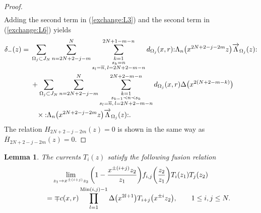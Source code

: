 \documentclass[pdftex]{sigma}
\numberwithin{equation}{section}
\newtheorem{Lemma}[Theorem]{Lemma}
\begin{document}
\begin{proof}
\begin{align}
\label{def:delta+}
\end{align}
Adding the second term in (\ref{exchange:L3}) and the second term in (\ref{exchange:L6}) yields
\begin{align}
{\delta}_-(z)={}&\sum_{\Omega_j \subset J_N}\sum_{n=2N+2-j-m}^{N}
\sum\limits_{\substack{k=1\\s_k=n
\\s_l=\overline{n},\, l=2N+2-m-n}}^{2N+1-m-n}d_{\Omega_j}(x,r)
{:}\Lambda_{n}\big(x^{2N+2-j-2m}z\big)\overrightarrow{\Lambda}_{\Omega_j}(z){:}\notag
\\
&+\sum_{\Omega_j \subset J_N}\sum_{n=2N+2-j-m}^{N}
\sum\limits_{\substack{k=1\\s_{k-1}\prec n \prec s_k
\\s_l=\overline{n}, \, l=2N+2-m-n}}^{2N+2-m-n}d_{\Omega_j}(x,r)\Delta\big(x^{2(N+2-m-k)}\big) \notag
\\
&\phantom{+}\times{:}\Lambda_{n}\big(x^{2N+2-j-2m}z\big)\overrightarrow{\Lambda}_{\Omega_j}(z){:}.
\label{def:delta-}
\end{align}
The relation $H_{2N+2-j-2m}(z)=0$ is shown in the same way as
$\overline{H}_{2N+2-j-2m}(z)=0$.
\end{proof}

{\samepage\begin{Lemma}
The {currents} $T_i(z)$ satisfy the following fusion relation
\begin{gather}
\lim_{z_1 \to x^{\pm (i+j)}z_2}
\bigg(1-\frac{x^{\pm (i+j)}z_2}{z_1}\bigg)f_{i,j}\bigg(\frac{z_2}{z_1}\bigg)T_i(z_1)T_j(z_2)\notag
\\ \qquad
{}=\mp c(x,r)\prod_{l=1}^{\operatorname{Min}(i,j)-1}\Delta\big(x^{2l+1}\big)T_{i+j}\big(x^{\pm i}z_2\big),\qquad
1\leq i, j \leq N.
\label{eqn:fusion-T1}
\end{gather}
\end{Lemma}}
\end{document}
